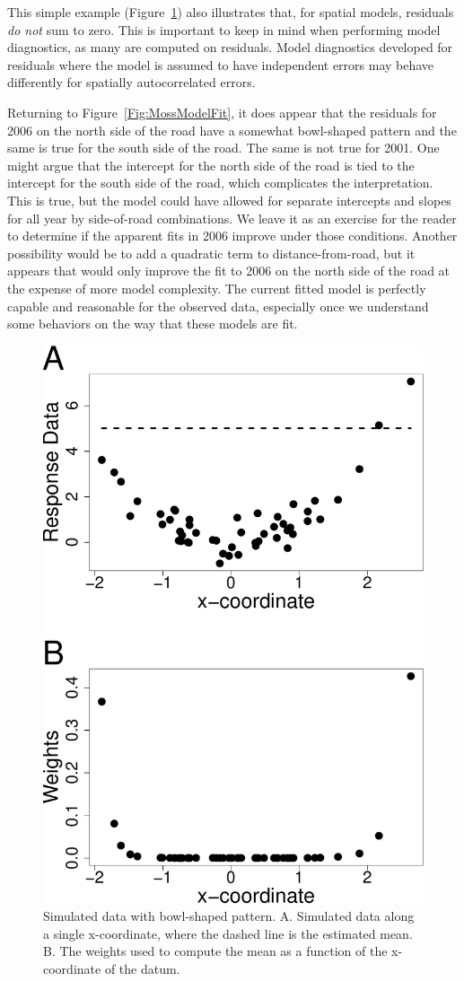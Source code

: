 \documentclass[12pt, titlepage]{article}
\begin{document}
This simple example (Figure~\ref{Fig:MossDishSim}) also illustrates that, for spatial models, residuals \textit{do not} sum to zero.  This is important to keep in mind when performing model diagnostics, as many are computed on residuals.  Model diagnostics developed for residuals where the model is assumed to have independent errors may behave differently for spatially autocorrelated errors.

Returning to Figure~\ref{Fig:MossModelFit}, it does appear that the residuals for 2006 on the north side of the road have a somewhat bowl-shaped pattern and the same is true for the south side of the road.  The same is not true for 2001.  One might argue that the intercept for the north side of the road is tied to the intercept for the south side of the road, which complicates the interpretation.  This is true, but the model could have allowed for separate intercepts and slopes for all year by side-of-road combinations.  We leave it as an exercise for the reader to determine if the apparent fits in 2006 improve under those conditions.  Another possibility would be to add a quadratic term to distance-from-road, but it appears that would only improve the fit to 2006 on the north side of the road at the expense of more model complexity.  The current fitted model is perfectly capable and reasonable for the observed data, especially once we understand some behaviors on the way that these models are fit.

\begin{figure}[H]
  \begin{center}
	    \includegraphics[width=0.6\linewidth]{Moss_dishsim}
  \end{center}
  \caption{Simulated data with bowl-shaped pattern.  A. Simulated data along a single x-coordinate, where the dashed line is the estimated mean.  B.  The weights used to compute the mean as a function of the x-coordinate of the datum.  \label{Fig:MossDishSim}}
\end{figure}
\end{document}
